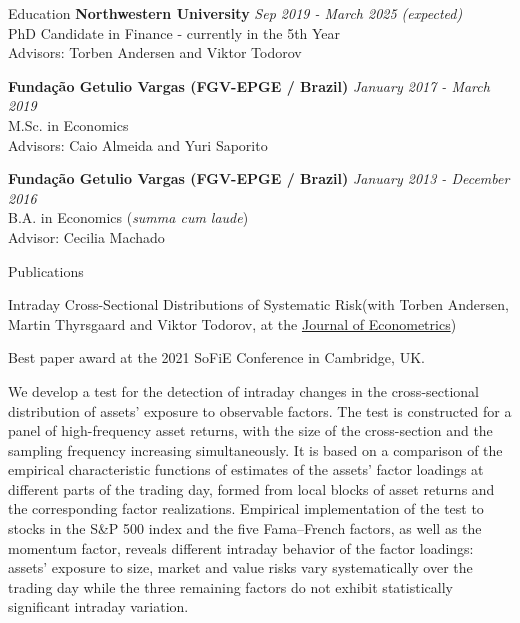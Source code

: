 \documentclass{resume} %
\begin{document}

\begin{rSection}{Education}
{\bf Northwestern University} \hfill {\em Sep 2019 - March 2025 (expected)}
\\ PhD Candidate in Finance - currently in the 5th Year\\
Advisors: Torben Andersen and Viktor Todorov

{\bf Funda\c{c}\~ao Getulio Vargas (FGV-EPGE / Brazil)} \hfill {\em January 2017 - March 2019}
\\ M.Sc. in Economics \\ Advisors: Caio Almeida and Yuri Saporito

{\bf Fundação Getulio Vargas (FGV-EPGE / Brazil)} \hfill {\em January 2013 - December 2016}
\\ B.A. in Economics (\textit{summa cum laude}) \\ Advisor: Cecilia Machado
\end{rSection}

\begin{rSection}{Publications}
\begin{rSubsection}{Intraday Cross-Sectional Distributions of Systematic Risk}{}{(with Torben Andersen, Martin Thyrsgaard and Viktor Todorov,  at the \underline{Journal of Econometrics})}{}

	Best paper award at the 2021 SoFiE Conference in Cambridge, UK.
	
	We develop a test for the detection of intraday changes in the cross-sectional distribution of assets’ exposure to observable factors. The test is constructed for a panel of high-frequency asset returns, with the size of the cross-section and the sampling frequency increasing simultaneously. It is based on a comparison of the empirical characteristic functions of estimates of the assets’ factor loadings at different parts of the trading day, formed from local blocks of asset returns and the corresponding factor realizations. Empirical implementation of the test to stocks in the S\&P 500 index and the five Fama–French factors, as well as the momentum factor, reveals different intraday behavior of the factor loadings: assets’ exposure to size, market and value risks vary systematically over the trading day while the three remaining factors do not exhibit statistically significant intraday variation.\end{rSubsection}
	
\end{rSection}
\end{document}
